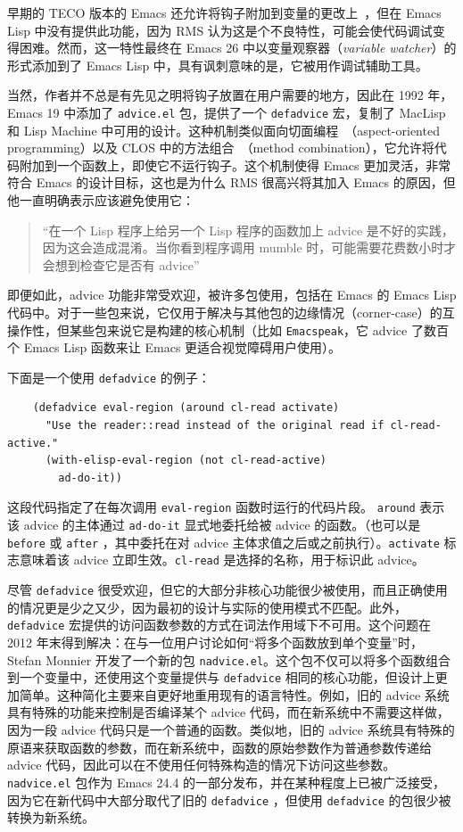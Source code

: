 \documentclass[format=acmsmall,screen]{acmart}
\begin{document}
早期的 TECO 版本的 Emacs 还允许将钩子附加到变量的更改上~\cite{Stallman1981}，但在 Emacs Lisp 中没有提供此功能，因为 RMS 认为这是个不良特性，可能会使代码调试变得困难。然而，这一特性最终在 Emacs 26 中以变量观察器（\emph{variable watcher}）的形式添加到了 Emacs Lisp 中，具有讽刺意味的是，它被用作调试辅助工具。

当然，作者并不总是有先见之明将钩子放置在用户需要的地方，因此在 1992 年，Emacs 19 中添加了 \texttt{advice.el} 包，提供了一个 \texttt{defadvice} 宏，复制了 MacLisp 和 Lisp Machine 中可用的设计。这种机制类似面向切面编程~\cite{Kiczales97}（aspect-oriented programming）以及 CLOS 中的方法组合~\cite{DeMichielGabriel1987}（method combination），它允许将代码附加到一个函数上，即使它不运行钩子。这个机制使得 Emacs 更加灵活，非常符合 Emacs 的设计目标，这也是为什么 RMS 很高兴将其加入 Emacs 的原因，但他一直明确表示应该避免使用它：

\begin{quotation}
  “在一个 Lisp 程序上给另一个 Lisp 程序的函数加上 advice 是不好的实践，因为这会造成混淆。当你看到程序调用 mumble 时，可能需要花费数小时才会想到检查它是否有 advice”~\cite{Stallman2018-personal}
\end{quotation}

即便如此，advice 功能非常受欢迎，被许多包使用，包括在 Emacs 的 Emacs Lisp 代码中。对于一些包来说，它仅用于解决与其他包的边缘情况（corner-case）的互操作性，但某些包来说它是构建的核心机制（比如 \texttt{Emacspeak}，它 advice 了数百个 Emacs Lisp 函数来让 Emacs 更适合视觉障碍用户使用）。

下面是一个使用 \texttt{defadvice} 的例子：
%
\begin{verbatim}
    (defadvice eval-region (around cl-read activate)
      "Use the reader::read instead of the original read if cl-read-active."
      (with-elisp-eval-region (not cl-read-active)
        ad-do-it))
\end{verbatim}
%
这段代码指定了在每次调用 \texttt{eval-region} 函数时运行的代码片段。 \texttt{around} 表示该 advice 的主体通过 \texttt{ad-do-it} 显式地委托给被 advice 的函数。（也可以是 \texttt{before} 或 \texttt{after} ，其中委托在对 advice 主体求值之后或之前执行）。\texttt{activate} 标志意味着该 advice 立即生效。\texttt{cl-read} 是选择的名称，用于标识此 advice。

尽管 \texttt{defadvice} 很受欢迎，但它的大部分非核心功能很少被使用，而且正确使用的情况更是少之又少，因为最初的设计与实际的使用模式不匹配。此外，\texttt{defadvice} 宏提供的访问函数参数的方式在词法作用域下不可用。这个问题在 2012 年末得到解决：在与一位用户讨论如何“将多个函数放到单个变量”时，Stefan Monnier 开发了一个新的包 \texttt{nadvice.el}。这个包不仅可以将多个函数组合到一个变量中，还使用这个变量提供与 \texttt{defadvice} 相同的核心功能，但设计上更加简单。这种简化主要来自更好地重用现有的语言特性。例如，旧的 advice 系统具有特殊的功能来控制是否编译某个 advice 代码，而在新系统中不需要这样做，因为一段 advice 代码只是一个普通的函数。类似地，旧的 advice 系统具有特殊的原语来获取函数的参数，而在新系统中，函数的原始参数作为普通参数传递给 advice 代码，因此可以在不使用任何特殊构造的情况下访问这些参数。\texttt{nadvice.el} 包作为 Emacs 24.4 的一部分发布，并在某种程度上已被广泛接受，因为它在新代码中大部分取代了旧的 \texttt{defadvice} ，但使用 \texttt{defadvice} 的包很少被转换为新系统。
\end{document}
